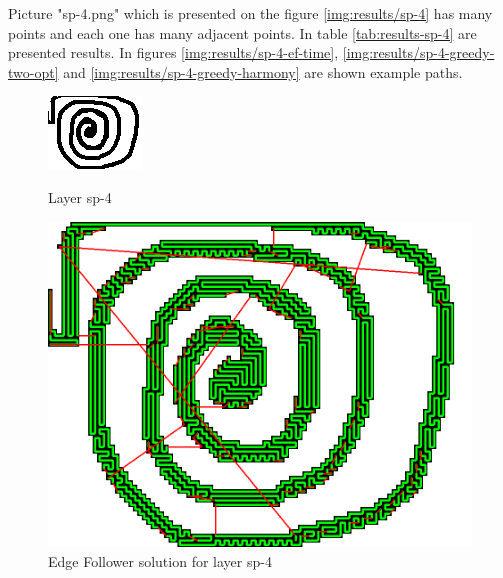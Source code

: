 \documentclass[titlepage]{article}
\newcommand{\multifigcaption}{\captionsetup{justification=justified}}
\begin{document}
Picture "sp-4.png" which is presented on the figure \ref{img:results/sp-4} has many points and each one has many adjacent points. In table \ref{tab:results-sp-4} are presented results. In figures \ref{img:results/sp-4-ef-time}, \ref{img:results/sp-4-greedy-two-opt} and \ref{img:results/sp-4-greedy-harmony} are shown example paths.

\begin{figure}[H]
	\begin{center}
		\begin{minipage}{.45\linewidth}
			\includegraphics[width=\textwidth]{img/results/sp-4.png}
			\multifigcaption
			\caption{Layer sp-4 \newline}
			\label{img:results/sp-4}
		\end{minipage}
		\hspace{.05\linewidth}
		\begin{minipage}{.45\linewidth}
			\includegraphics[width=\textwidth]{img/results/sp-4-ef-energy.png}
			\multifigcaption
			\caption{Edge Follower solution for layer sp-4}
			\label{img:results/sp-4-ef-energy}
		\end{minipage}
	\end{center}
\end{figure}
\end{document}
